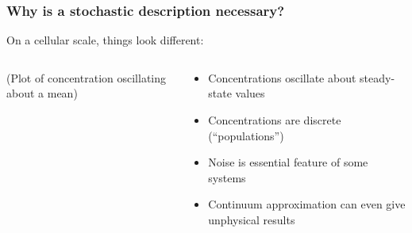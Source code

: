 \documentclass[xcolor={usenames,dvipsnames,svgnames}]{beamer}
\begin{document}
\begin{frame}
    \frametitle{Why is a stochastic description necessary?}
    On a cellular scale, things look different:
    \hfill
    \begin{columns}[c]
        \begin{column}{0.5\textwidth}
            (Plot of concentration oscillating about a mean)
        \end{column}
        \begin{column}{0.5\textwidth}
            \begin{itemize}
                \item Concentrations oscillate about steady-state values
                \item Concentrations are discrete (``populations'')
                \item Noise is essential feature of some systems
                \item Continuum approximation can even give unphysical results
            \end{itemize}
        \end{column}
    \end{columns}
\end{frame}
\end{document}

